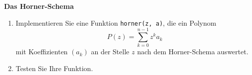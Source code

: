 \textbf{Das Horner-Schema}
\begin{enumerate}
	\item Implementieren Sie eine Funktion \verb|horner(z, a)|, die ein Polynom
$$
	P(z) = \sum_{k=0}^{n-1} z^k a_k
$$
mit Koeffizienten $(a_k)$ an der Stelle $z$ nach dem Horner-Schema auswertet.
	\item Testen Sie Ihre Funktion.
\end{enumerate}